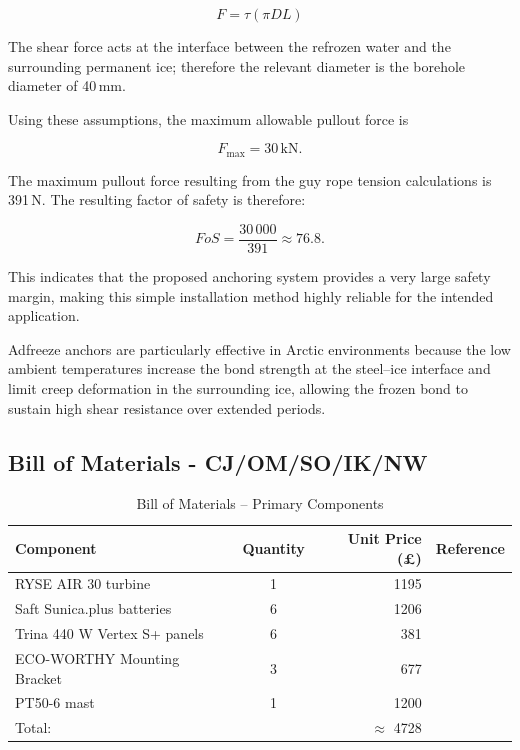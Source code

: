 \documentclass[11pt,a4paper]{article}
\begin{document}
\[
F = \tau (\pi D L)
\]

 The shear force acts at the interface between the refrozen water and the surrounding permanent ice; therefore the relevant diameter is the borehole diameter of 40\,mm.

Using these assumptions, the maximum allowable pullout force is

\[
F_{\text{max}} = 30\,\text{kN}.
\]

The maximum pullout force resulting from the guy rope tension calculations is 391\,N. The resulting factor of safety is therefore:

\[
FoS = \frac{30\,000}{391} \approx 76.8.
\]

This indicates that the proposed anchoring system provides a very large safety margin, making this simple installation method highly reliable for the intended application.

Adfreeze anchors are particularly effective in Arctic environments because the low ambient temperatures increase the bond strength at the steel--ice interface and limit creep deformation in the surrounding ice, allowing the frozen bond to sustain high shear resistance over extended periods.


\subsection{Bill of Materials - CJ/OM/SO/IK/NW}

\begin{table}[H]
\centering
\caption{Bill of Materials -- Primary Components}
\label{tab:bom_primary}
\begin{tabular}{lcrc}
\toprule
Component & Quantity & Unit Price (£) & Reference\\
\midrule
RYSE AIR 30 turbine & 1 & 1195 & \cite{windturbine}\\
Saft Sunica.plus batteries & 6 & 1206 & \cite{Battery Final}\\
Trina 440 W Vertex S+ panels & 6 & 381 & \cite{trina}\\
ECO-WORTHY Mounting Bracket & 3 & 677 & \cite{ECO-WORTHY Mounting Bracket}\\
PT50-6 mast & 1 & 1200 & \cite{Pole}\\
\midrule
Total: &  & $\approx$ 4728 \\
\bottomrule
\end{tabular}
\end{table}
\end{document}
